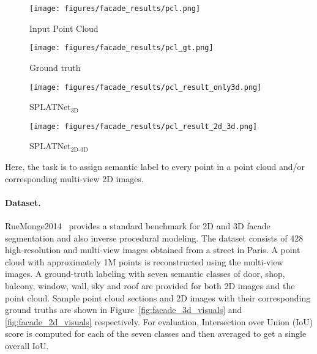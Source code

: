 \documentclass[10pt,twocolumn,letterpaper]{article}
\newcommand{\mycaption}[2]{\caption{\textbf{#1.}\xspace#2}}
\def\modelthree{SPLATNet$_{\text{3D}}$\xspace}
\def\modeljoint{SPLATNet$_{\text{2D-3D}}$\xspace}
\begin{document}
\begin{table}[!tb]
    \label{tab:facade_results_2d}
    \vspace{-3mm}
\end{table}\begin{figure*}[!htb]
\captionsetup[subfigure]{labelformat=empty}
\begin{subfigure}{.24\textwidth}
\centering
\texttt{[image: figures/facade\_results/pcl.png]}
\caption{Input Point Cloud}
\end{subfigure}
\begin{subfigure}{.24\textwidth}
\centering
\texttt{[image: figures/facade\_results/pcl\_gt.png]}
\caption{Ground truth}
\end{subfigure}
\begin{subfigure}{.24\textwidth}
\centering
\texttt{[image: figures/facade\_results/pcl\_result\_only3d.png]}
\caption{\modelthree}
\end{subfigure}
\begin{subfigure}{.24\textwidth}
\centering
\texttt{[image: figures/facade\_results/pcl\_result\_2d\_3d.png]}
\caption{\modeljoint}
\end{subfigure}
\vspace{-.1cm}
\mycaption{Facade point cloud labeling}{Sample visual results of \modelthree and \modeljoint.}
\vspace{-.2cm}
\label{fig:facade_3d_visuals}
\end{figure*}Here, the task is to assign semantic label to every point in a point cloud and/or corresponding
multi-view 2D images.

\vspace{-0.35cm}\paragraph{Dataset.} RueMonge2014~\cite{riemenschneider2014learning} provides
a standard benchmark for 2D and 3D facade segmentation and also inverse procedural
modeling. The dataset consists of 428 high-resolution and multi-view images obtained
from a street in Paris. A point cloud with approximately 1M points is reconstructed
using the multi-view images. A ground-truth labeling with seven semantic classes of
door, shop, balcony, window, wall, sky and roof are provided for both 2D images and
the point cloud. Sample point cloud sections and 2D images with their corresponding ground truths
are shown in Figure~\ref{fig:facade_3d_visuals} and \ref{fig:facade_2d_visuals}
respectively. For evaluation, Intersection over Union (IoU) score is computed for
each of the seven classes and then averaged to get a single overall IoU.
\end{document}
